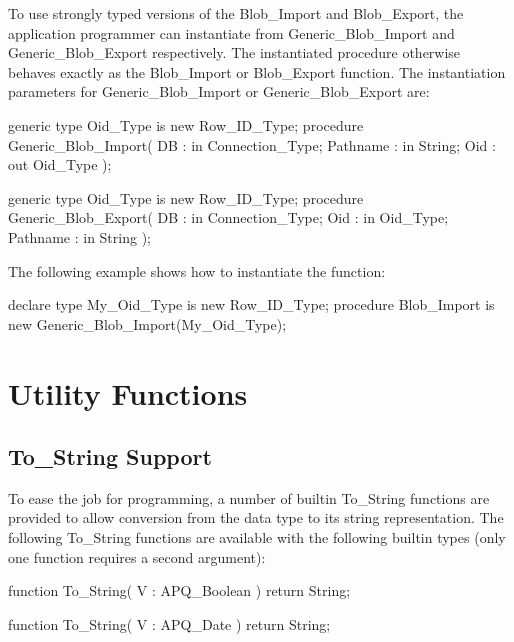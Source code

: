 \documentclass[english,letterpaper]{book}
\begin{document}
To use strongly typed versions of the Blob\_Import and Blob\_Export,
the application programmer can instantiate from Generic\_Blob\_Import
and Generic\_Blob\_Export respectively. The instantiated procedure
otherwise behaves exactly as the Blob\_Import or Blob\_Export function.
The instantiation parameters for Generic\_Blob\_Import or Generic\_Blob\_Export
are:

\begin{Code}
generic
   type Oid_Type is new Row_ID_Type;
procedure Generic_Blob_Import(
   DB :       in     Connection_Type;
   Pathname : in     String;
   Oid :         out Oid_Type
);
\end{Code}

\begin{Code}
generic
   type Oid_Type is new Row_ID_Type;
procedure Generic_Blob_Export(
   DB :       in     Connection_Type;
   Oid :      in     Oid_Type;
   Pathname : in     String
);
\end{Code}

The following example shows how to instantiate the function:

\begin{Example}
declare
   type My_Oid_Type is new Row_ID_Type;
   procedure Blob_Import is new
      Generic_Blob_Import(My_Oid_Type);
\end{Example}


\chapter{Utility Functions} %

\section{To\_String Support}

To ease the job for programming, a number of builtin To\_String functions
are provided to allow conversion from the data type to its string
representation. The following To\_String functions are available with
the following builtin types (only one function requires a second argument):

\begin{Code}
function To_String(
   V : APQ_Boolean
) return String;
\end{Code}

\begin{Code}
function To_String(
   V : APQ_Date
) return String;
\end{Code}
\end{document}
